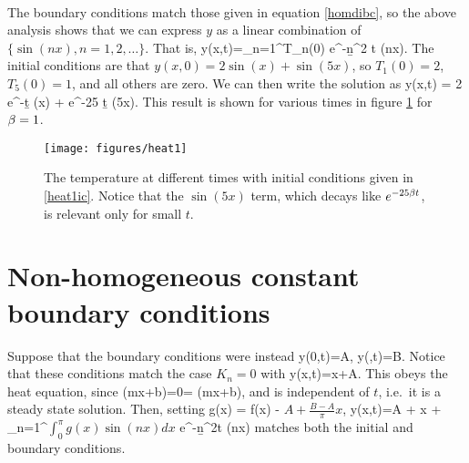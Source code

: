 \documentclass[12pt]{book}
\begin{document}
\\
{
  The boundary conditions match those given in equation \eqref{homdibc}, so
  the above analysis shows that we can express $y$ as a linear combination
  of $\{\sin(nx),n=1,2,\dots\}$. That is,
  \bee
  y(x,t)=\sum_{n=1}^\infty T_n(0) e^{-\b n^2 t} \sin(nx).
  \eee
  The initial conditions are that $y(x,0)=2\sin(x)+\sin(5x)$, so $T_1(0)=2$,
  $T_5(0)=1$, and all others are zero. We can then write the solution as
  \bee
  y(x,t) = 2 e^{-\b t} \sin(x) + e^{-25 \b t} \sin(5x).
  \eee
 This result is shown for various times in figure \ref{heat1} for $\beta=1$.
  \begin{figure}[htbp]
    \begin{center}
      \texttt{[image: figures/heat1]}
      \caption{The temperature at different times with initial conditions
        given in \eqref{heat1ic}. Notice that the $\sin(5x)$ term, which
        decays like $e^{-25 \beta t}$, is relevant only for small $t$. }
      \label{heat1}
    \end{center}
  \end{figure}
}


\section{Non-homogeneous constant boundary conditions}

Suppose that the boundary conditions were instead
\bee
y(0,t)=A, \qquad y(\pi,t)=B.
\eee
Notice that these conditions match the case $K_n=0$ with
\bee
y(x,t)=x+A.
\eee
This obeys the heat equation, since
\bee
{}(mx+b)=0= (mx+b),
\eee
and is independent of $t$, i.e.\ it is a steady state solution. Then, setting
\bee
g(x) = f(x) - \(A+ \frac{B-A}{\pi}x\),
\eee
\be
\label{diribc}
y(x,t)=A + x +
\sum_{n=1}^\infty\(\int_{0}^\pi g(x)\sin(nx)dx\) e^{-\b n^2t} \sin(nx)
\ee
matches both the initial and boundary conditions.
\end{document}
